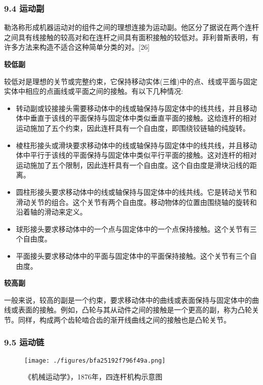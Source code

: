 \subsubsection{9.4 运动副}

勒洛称形成机器运动对的组件之间的理想连接为运动副。他区分了据说在两个连杆之间具有线接触的较高对和在连杆之间具有面积接触的较低对。菲利普斯表明，有许多方法来构造不适合这种简单分类的对。[26]

\textbf{较低副}

较低对是理想的关节或完整约束，它保持移动实体(三维)中的点、线或平面与固定实体中相应的点画线或平面之间的接触。有以下几种情况:

\begin{itemize}
\item 转动副或铰接接头需要移动体中的线或轴保持与固定体中的线共线，并且移动体中垂直于该线的平面保持与固定体中类似垂直平面的接触。这给连杆的相对运动施加了五个约束，因此连杆具有一个自由度，即围绕铰链轴的纯旋转。
\item 棱柱形接头或滑块要求移动体中的线或轴保持与固定体中的线共线，并且移动体中平行于该线的平面保持与固定体中类似平行平面的接触。这对连杆的相对运动施加了五个限制，因此连杆具有一个自由度。这个自由度是滑块沿线的距离。
\item 圆柱形接头要求移动体中的线或轴保持与固定体中的线共线。它是转动关节和滑动关节的组合。这个关节有两个自由度。移动物体的位置由围绕轴的旋转和沿着轴的滑动来定义。
\item 球形接头要求移动体中的一个点与固定体中的一个点保持接触。这个关节有三个自由度。
\item 平面接头要求移动体中的平面与固定体中的平面保持接触。这个关节有三个自由度。
\end{itemize}


\textbf{较高副}

一般来说，较高的副是一个约束，要求移动体中的曲线或表面保持与固定体中的曲线或表面的接触。例如，凸轮与其从动件之间的接触是一个更高的副，称为凸轮关节。同样，构成两个齿轮啮合齿的渐开线曲线之间的接触也是凸轮关节。

\subsubsection{9.5 运动链}

\begin{figure}[ht]
\centering
\texttt{[image: ./figures/bfa25192f796f49a.png]}
\caption{《机械运动学》，1876年，四连杆机构示意图} \label{fig_YDX_1}
\end{figure}

